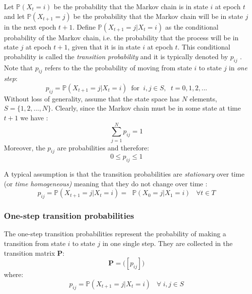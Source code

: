 \documentclass[\main/main.tex]{subfiles}
\begin{document}
Let $\mathds{P}(X_t = i)$ be the probability that the Markov chain is in state $i$ at epoch $t$ and let $\mathds{P}(X_{t+1} = j)$ be the probability that the Markov chain will be in state $j$ in the next epoch $t+1$. Define $\mathds{P}(X_{t+1}
= j|X_{t} = i)$ as the conditional probability of the Markov chain, i.e. the probability that the process will be in state $j$ at epoch $t + 1$, given that it is in state $i$ at epoch $t$. 
This conditional probability is called the \textit{transition probability} and it is typically denoted by $p_{ij}$ \citep{Sheskin2010}. Note that $p_{ij}$  refers to the the probability of moving from state $i$ to state $j$ in \textit{one step}:
\begin{equation}
    p_{ij} = \mathds{P}(X_{t+1} = j |X_t = i) \; \; \text{for}\; \; i,j \in S, \; \; t=0,1,2,...
\end{equation}
Without loss of generality, assume that the state space has $N$ elements, $S=\{1,2,...,N\} $. Clearly, since the Markov chain must be in some state at time $t+1$ we have \citep{Howard1960}:
\begin{equation}
 \sum_{j=1}^N     p_{ij} = 1
\end{equation}
 Moreover, the $p_{ij}$ are probabilities and therefore:
\begin{equation}
 0 \leq p_{ij} \leq 1
\end{equation}

A typical assumption is that the transition probabilities are \textit{stationary} over time (or \textit{time homogeneous)} meaning that they do not change over time \citep{Sheskin2010}:
\begin{equation}
    p_{ij} = \mathds{P}(X_{t+1} = j |X_t = i)  = \; \; \mathds{P}(X_{0} = j |X_1 = i) \;\;\; \forall t \in T
\end{equation}

\subsubsection{One-step transition probabilities}
\noindent The one-step transition probabilities represent the probability of making a transition from state $i$ to state $j$ in one single step. They are collected in the transition matrix $\mathbf{P}$:
\begin{equation}
   \mathbf{P} = \Big([ p_{ij}] \Big)
\end{equation}
where:
\begin{equation}
    p_{ij} = \mathds{P} ( X_{t+1} = j | X_t = i) \;\;\; \forall \; i,j \in S
\end{equation}
\end{document}
